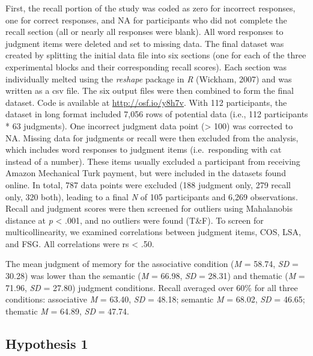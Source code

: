 \documentclass[english,man]{apa6}
\theoremstyle{definition}
\theoremstyle{definition}
\theoremstyle{definition}
\theoremstyle{remark}
\begin{document}
First, the recall portion of the study was coded as zero for incorrect
responses, one for correct responses, and NA for participants who did
not complete the recall section (all or nearly all responses were
blank). All word responses to judgment items were deleted and set to
missing data. The final dataset was created by splitting the initial
data file into six sections (one for each of the three experimental
blocks and their corresponding recall scores). Each section was
individually melted using the \emph{reshape} package in \emph{R}
(Wickham, 2007) and was written as a csv file. The six output files were
then combined to form the final dataset. Code is available at
\url{http://osf.io/y8h7v}. With 112 participants, the dataset in long
format included 7,056 rows of potential data (i.e., 112 participants *
63 judgments). One incorrect judgment data point (\textgreater{} 100)
was corrected to NA. Missing data for judgments or recall were then
excluded from the analysis, which includes word responses to judgment
items (i.e.~responding with cat instead of a number). These items
usually excluded a participant from receiving Amazon Mechanical Turk
payment, but were included in the datasets found online. In total, 787
data points were excluded (188 judgment only, 279 recall only, 320
both), leading to a final \emph{N} of 105 participants and 6,269
observations. Recall and judgment scores were then screened for outliers
using Mahalanobis distance at \emph{p} \textless{} .001, and no outliers
were found (T\&F). To screen for multicollinearity, we examined
correlations between judgment items, COS, LSA, and FSG. All correlations
were rs \textless{} .50.

The mean judgment of memory for the associative condition (\emph{M} =
58.74, \emph{SD} = 30.28) was lower than the semantic (\emph{M} = 66.98,
\emph{SD} = 28.31) and thematic (\emph{M} = 71.96, \emph{SD} = 27.80)
judgment conditions. Recall averaged over 60\% for all three conditions:
associative \emph{M} = 63.40, \emph{SD} = 48.18; semantic \emph{M} =
68.02, \emph{SD} = 46.65; thematic \emph{M} = 64.89, \emph{SD} = 47.74.

\subsection{Hypothesis 1}\label{hypothesis-1}
\end{document}
